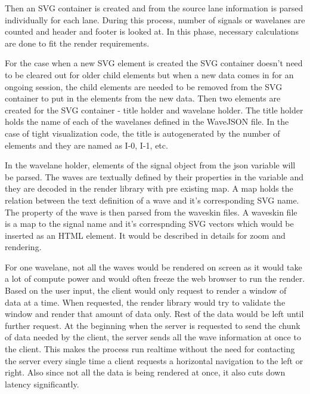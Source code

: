 \documentclass[14pt]{extarticle}
\begin{document}
\par Then an SVG container is created and from the source lane information is parsed individually for each lane. During this process, number of signals or wavelanes are counted and header and footer is looked at. In this phase, necessary calculations are done to fit the render requirements.
\par For the case when a new SVG element is created the SVG container doesn't need to be cleared out for older child elements but when a new data comes in for an ongoing session, the child elements are needed to be removed from the SVG container to put in the elements from the new data. Then two elements are created for the SVG container - title holder and wavelane holder. The title holder holds the name of each of the wavelanes defined in the WaveJSON file. In the case of tight visualization code, the title is autogenerated by the number of elements and they are named as I-0, I-1, etc.
\par In the wavelane holder, elements of the signal object from the json variable will be parsed. The waves are textually defined by their properties in the variable and they are decoded in the render library with pre existing map. A map holds the relation between the text definition of a wave and it's corresponding SVG name. The property of the wave is then parsed from the waveskin files. A waveskin file is a map to the signal name and it's correspnding SVG vectors which would be inserted as an HTML element. It would be described in details for zoom and rendering. 
\par For one wavelane, not all the waves would be rendered on screen as it would take a lot of compute power and would often freeze the web browser to run the render. Based on the user input, the client would only request to render a window of data at a time. When requested, the render library would try to validate the window and render that amount of data only. Rest of the data would be left until further request. At the beginning when the server is requested to send the chunk of data needed by the client, the server sends all the wave information at once to the client. This makes the process run realtime without the need for contacting the server every single time a client requests a horizontal navigation to the left or right. Also since not all the data is being rendered at once, it also cuts down latency significantly.
\end{document}

